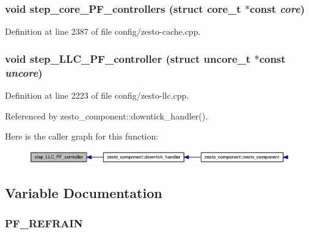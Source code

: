 \subsubsection[{step\_\-core\_\-PF\_\-controllers}]{\setlength{\rightskip}{0pt plus 5cm}void step\_\-core\_\-PF\_\-controllers (struct {\bf core\_\-t} $\ast$const  {\em core})}\label{config_2zesto-cache_8h_66309167ab5b4ca25ad2bfbf94b0126b}




Definition at line 2387 of file config/zesto-cache.cpp.
\subsubsection[{step\_\-LLC\_\-PF\_\-controller}]{\setlength{\rightskip}{0pt plus 5cm}void step\_\-LLC\_\-PF\_\-controller (struct {\bf uncore\_\-t} $\ast$const  {\em uncore})}\label{config_2zesto-cache_8h_65086cfd5f54ff7a76a41587c8f6a01e}




Definition at line 2223 of file config/zesto-llc.cpp.

Referenced by zesto\_\-component::downtick\_\-handler().

Here is the caller graph for this function:\nopagebreak
\begin{figure}[H]
\begin{center}
\leavevmode
\includegraphics[width=331pt]{config_2zesto-cache_8h_65086cfd5f54ff7a76a41587c8f6a01e_icgraph}
\end{center}
\end{figure}


\subsection{Variable Documentation}
\subsubsection[{PF\_\-REFRAIN}]{\setlength{\rightskip}{0pt plus 5cm}PF\_\-REFRAIN}\label{config_2zesto-cache_8h_767dc97864efb5256750ade278765646}




